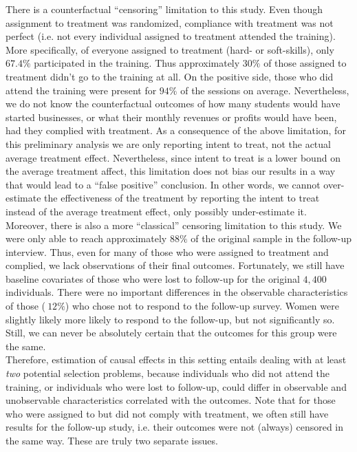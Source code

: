 There is a counterfactual ``censoring'' limitation to this study. Even though assignment to treatment was randomized, compliance with treatment was not perfect (i.e. not every individual assigned to treatment attended the training). More specifically, of everyone assigned to treatment (hard- or soft-skills), only $67.4\%$ participated in the training. Thus approximately $30\%$ of those assigned to treatment didn't go to the training at all. On the positive side, those who did attend the training were present for $94\%$ of the sessions on average. Nevertheless, we do not know the counterfactual outcomes of how many students would have started businesses, or what their monthly revenues or profits would have been, had they complied with treatment. As a consequence of the above limitation, for this preliminary analysis we are only reporting intent to treat, not the actual average treatment effect. Nevertheless, since intent to treat is a lower bound on the average treatment affect, this limitation does not bias our results in a way that would lead to a ``false positive'' conclusion. In other words, we cannot over-estimate the effectiveness of the treatment by reporting the intent to treat instead of the average treatment effect, only possibly under-estimate it.\\

 Moreover, there is also a more ``classical'' censoring limitation to this study. We were only able to reach approximately $88\%$ of the original sample in the follow-up interview. Thus, even for many of those who were assigned to treatment and complied, we lack observations of their final outcomes. Fortunately, we still have baseline covariates of those who were lost to follow-up for the original $4,400$ individuals. There were no important differences in the observable characteristics of those ($~12\%$) who chose not to respond to the follow-up survey. Women were slightly likely more likely to respond to the follow-up, but not significantly so. Still, we can never be absolutely certain that the outcomes for this group were the same.\\

Therefore, estimation of causal effects in this setting entails dealing with at least \textit{two} potential selection problems, because individuals who did not attend the training, or individuals who were lost to follow-up, could differ in observable and unobservable characteristics correlated with the outcomes. Note that for those who were assigned to but did not comply with treatment, we often still have results for the follow-up study, i.e. their outcomes were not (always) censored in the same way. These are truly two separate issues.\\

